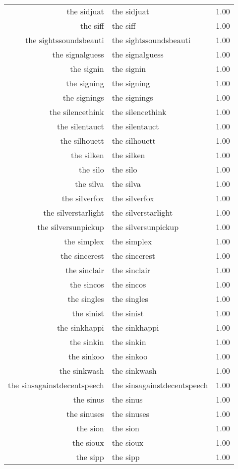 \begin{table}[ht]
\begin{tabular}{rlr}
  the sidjuat & the sidjuat & 1.00 \\ 
  the siff & the siff & 1.00 \\ 
  the sightssoundsbeauti & the sightssoundsbeauti & 1.00 \\ 
  the signalguess & the signalguess & 1.00 \\ 
  the signin & the signin & 1.00 \\ 
  the signing & the signing & 1.00 \\ 
  the signings & the signings & 1.00 \\ 
  the silencethink & the silencethink & 1.00 \\ 
  the silentauct & the silentauct & 1.00 \\ 
  the silhouett & the silhouett & 1.00 \\ 
  the silken & the silken & 1.00 \\ 
  the silo & the silo & 1.00 \\ 
  the silva & the silva & 1.00 \\ 
  the silverfox & the silverfox & 1.00 \\ 
  the silverstarlight & the silverstarlight & 1.00 \\ 
  the silversunpickup & the silversunpickup & 1.00 \\ 
  the simplex & the simplex & 1.00 \\ 
  the sincerest & the sincerest & 1.00 \\ 
  the sinclair & the sinclair & 1.00 \\ 
  the sincos & the sincos & 1.00 \\ 
  the singles & the singles & 1.00 \\ 
  the sinist & the sinist & 1.00 \\ 
  the sinkhappi & the sinkhappi & 1.00 \\ 
  the sinkin & the sinkin & 1.00 \\ 
  the sinkoo & the sinkoo & 1.00 \\ 
  the sinkwash & the sinkwash & 1.00 \\ 
  the sinsagainstdecentspeech & the sinsagainstdecentspeech & 1.00 \\ 
  the sinus & the sinus & 1.00 \\ 
  the sinuses & the sinuses & 1.00 \\ 
  the sion & the sion & 1.00 \\ 
  the sioux & the sioux & 1.00 \\ 
  the sipp & the sipp & 1.00 \\ 

\end{tabular}
\end{table}
